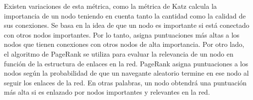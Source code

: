Existen variaciones de esta métrica, como la métrica de Katz calcula la importancia de un nodo teniendo en cuenta tanto la cantidad como la calidad de sus conexiones. Se basa en la idea de que un nodo es importante si está conectado con otros nodos importantes. Por lo tanto, asigna puntuaciones más altas a los nodos que tienen conexiones con otros nodos de alta importancia.
Por otro lado, el algoritmo de PageRank se utiliza para evaluar la relevancia de un nodo en función de la estructura de enlaces en la red. PageRank asigna puntuaciones a los nodos según la probabilidad de que un navegante aleatorio termine en ese nodo al seguir los enlaces de la red. En otras palabras, un nodo obtendrá una puntuación más alta si es enlazado por nodos importantes y relevantes en la red.
